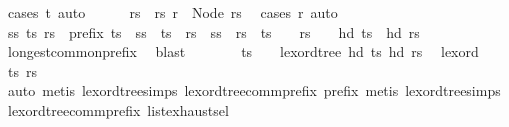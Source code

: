\begin{isabellebody}
\ {\isacharparenleft}{\kern0pt}cases\ t{\isacharparenright}{\kern0pt}\ auto\isanewline
\ \ \ \ \isamarkupfalse%
\ rs\ \ rs{\isacharcolon}{\kern0pt}\ {\isachardoublequoteopen}r\ {\isacharequal}{\kern0pt}\ Node\ rs{\isachardoublequoteclose}\ \isamarkupfalse%
\ {\isacharparenleft}{\kern0pt}cases\ r{\isacharparenright}{\kern0pt}\ auto\isanewline
\ \ \ \ \isamarkupfalse%
\ ss\ ts{\isacharprime}{\kern0pt}\ rs{\isacharprime}{\kern0pt}\ \ prefix{\isacharcolon}{\kern0pt}\ {\isachardoublequoteopen}ts\ {\isacharequal}{\kern0pt}\ ss\ {\isacharat}{\kern0pt}\ ts{\isacharprime}{\kern0pt}\ {\isasymand}\ rs\ {\isacharequal}{\kern0pt}\ ss\ {\isacharat}{\kern0pt}\ rs{\isacharprime}{\kern0pt}\ {\isasymand}\ {\isacharparenleft}{\kern0pt}ts{\isacharprime}{\kern0pt}\ {\isacharequal}{\kern0pt}\ {\isacharbrackleft}{\kern0pt}{\isacharbrackright}{\kern0pt}\ {\isasymor}\ rs{\isacharprime}{\kern0pt}\ {\isacharequal}{\kern0pt}\ {\isacharbrackleft}{\kern0pt}{\isacharbrackright}{\kern0pt}\ {\isasymor}\ hd\ ts{\isacharprime}{\kern0pt}\ {\isasymnoteq}\ hd\ rs{\isacharprime}{\kern0pt}{\isacharparenright}{\kern0pt}{\isachardoublequoteclose}\ \isamarkupfalse%
\ longest{\isacharunderscore}{\kern0pt}common{\isacharunderscore}{\kern0pt}prefix\ \isamarkupfalse%
\ blast\isanewline
\ \ \ \ \isamarkupfalse%
\ \isamarkupfalse%
\ {\isachardoublequoteopen}ts{\isacharprime}{\kern0pt}\ {\isacharequal}{\kern0pt}\ {\isacharbrackleft}{\kern0pt}{\isacharbrackright}{\kern0pt}\ {\isasymor}\ lexord{\isacharunderscore}{\kern0pt}tree\ {\isacharparenleft}{\kern0pt}hd\ ts{\isacharprime}{\kern0pt}{\isacharparenright}{\kern0pt}\ {\isacharparenleft}{\kern0pt}hd\ rs{\isacharprime}{\kern0pt}{\isacharparenright}{\kern0pt}{\isachardoublequoteclose}\ \isamarkupfalse%
\ lexord\ \isamarkupfalse%
\ ts\ rs\isanewline
\ \ \ \ \ \ \isamarkupfalse%
\ {\isacharparenleft}{\kern0pt}auto{\isacharcomma}{\kern0pt}\ metis\ lexord{\isacharunderscore}{\kern0pt}tree{\isachardot}{\kern0pt}simps{\isacharparenleft}{\kern0pt}{}{\isacharparenright}{\kern0pt}\ lexord{\isacharunderscore}{\kern0pt}tree{\isacharunderscore}{\kern0pt}comm{\isacharunderscore}{\kern0pt}prefix\ prefix{\isacharcomma}{\kern0pt}\ metis\ lexord{\isacharunderscore}{\kern0pt}tree{\isachardot}{\kern0pt}simps{\isacharparenleft}{\kern0pt}{}{\isacharcomma}{\kern0pt}{}{\isacharparenright}{\kern0pt}\ lexord{\isacharunderscore}{\kern0pt}tree{\isacharunderscore}{\kern0pt}comm{\isacharunderscore}{\kern0pt}prefix\ list{\isachardot}{\kern0pt}exhaust{\isacharunderscore}{\kern0pt}sel{\isacharparenright}{\kern0pt}\isanewline

\end{isabellebody}
